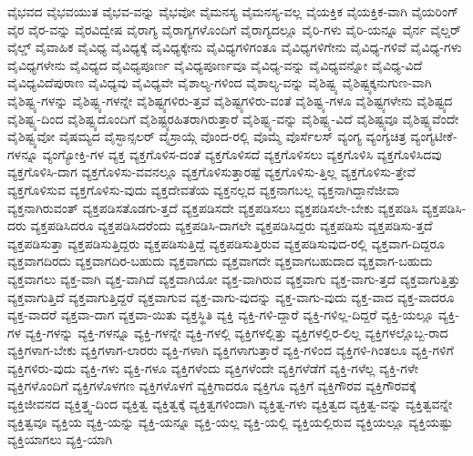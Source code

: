 {ವೈಭವದ
ವೈಭವಯುತ
ವೈಭವ-ವನ್ನು
ವೈಭವೋ
ವೈಮನಸ್ಯ
ವೈಮನಸ್ಯ-ವಲ್ಲ
ವೈಯಕ್ತಿಕ
ವೈಯಕ್ತಿಕ-ವಾಗಿ
ವೈಯರಿಂಗ್
ವೈರ
ವೈರ-ವನ್ನು
ವೈರವಿದ್ವೇಷ
ವೈರಾಗ್ಯ
ವೈರಾಗ್ಯಗಳೊಂದಿಗೆ
ವೈರಾಗ್ಯದಲ್ಲೂ
ವೈರಿ-ಗಳು
ವೈರಿ-ಯನ್ನೂ
ವೈರ್ನ
ವೈಲ್ಡರ್
ವೈಲ್ಡ್
ವೈವಾಹಿಕ
ವೈವಿಧ್ಯ
ವೈವಿಧ್ಯಕ್ಕೆ
ವೈವಿಧ್ಯಕ್ಕೇನು
ವೈವಿಧ್ಯಗಳಿಗಂತೂ
ವೈವಿಧ್ಯಗಳಿಗೇನು
ವೈವಿಧ್ಯ-ಗಳಿವೆ
ವೈವಿಧ್ಯ-ಗಳು
ವೈವಿಧ್ಯಗಳೇನು
ವೈವಿಧ್ಯದ
ವೈವಿಧ್ಯಪೂರ್ಣ
ವೈವಿಧ್ಯಪೂರ್ಣವೂ
ವೈವಿಧ್ಯ-ವನ್ನು
ವೈವಿಧ್ಯವನ್ನೋ
ವೈವಿಧ್ಯ-ವಿದೆ
ವೈವಿಧ್ಯವಿದೆಪುರಾಣ
ವೈವಿಧ್ಯವು
ವೈವಿಧ್ಯವೇ
ವೈಶಾಲ್ಯ-ಗಳಿಂದ
ವೈಶಾಲ್ಯ-ವನ್ನು
ವೈಶಿಷ್ಟ್ಯ
ವೈಶಿಷ್ಟ್ಯಕ್ಕನುಗುಣ-ವಾಗಿ
ವೈಶಿಷ್ಟ್ಯ-ಗಳನ್ನು
ವೈಶಿಷ್ಟ್ಯ-ಗಳನ್ನೇ
ವೈಶಿಷ್ಟ್ಯಗಳಿರು-ತ್ತವೆ
ವೈಶಿಷ್ಟ್ಯಗಳಿರು-ವಂತೆ
ವೈಶಿಷ್ಟ್ಯ-ಗಳೂ
ವೈಶಿಷ್ಟ್ಯಗಳೇನು
ವೈಶಿಷ್ಟ್ಯದ
ವೈಶಿಷ್ಟ್ಯ-ದಿಂದ
ವೈಶಿಷ್ಟ್ಯದೊಂದಿಗೆ
ವೈಶಿಷ್ಟ್ಯರಹಿತರಾಗಿರುತ್ತಾರೆ
ವೈಶಿಷ್ಟ್ಯ-ವನ್ನು
ವೈಶಿಷ್ಟ್ಯ-ವಿದೆ
ವೈಶಿಷ್ಟ್ಯವೂ
ವೈಶಿಷ್ಟ್ಯವೆಂದೇ
ವೈಶಿಷ್ಟ್ಯವೋ
ವೈಷಮ್ಯದ
ವೈಸ್ಛಾನ್ಸಲರ್
ವೈಸ್ರಾಯ್ಗೆ
ವೊಂದ-ರಲ್ಲಿ
ವೊಮ್ಮೆ
ವೊರ್ಸೆಲಸ್
ವ್ಯಂಗ್ಯ
ವ್ಯಂಗ್ಯಚಿತ್ರ
ವ್ಯಂಗ್ಯಟೀಕೆ-ಗಳನ್ನೂ
ವ್ಯಂಗ್ಯೋಕ್ತಿ-ಗಳ
ವ್ಯಕ್ತ
ವ್ಯಕ್ತಗೊಳಿಸ-ದಂತೆ
ವ್ಯಕ್ತಗೊಳಿಸದೆ
ವ್ಯಕ್ತಗೊಳಿಸಲು
ವ್ಯಕ್ತಗೊಳಿಸಿ
ವ್ಯಕ್ತಗೊಳಿಸಿದವು
ವ್ಯಕ್ತಗೊಳಿಸಿ-ದಾಗ
ವ್ಯಕ್ತಗೊಳಿಸು-ವವನಲ್ಲೂ
ವ್ಯಕ್ತಗೊಳಿಸುತ್ತಾರಷ್ಟೆ
ವ್ಯಕ್ತಗೊಳಿಸು-ತ್ತಿಲ್ಲ
ವ್ಯಕ್ತಗೊಳಿಸು-ತ್ತೇವೆ
ವ್ಯಕ್ತಗೊಳಿಸುವ
ವ್ಯಕ್ತಗೊಳಿಸು-ವುದು
ವ್ಯಕ್ತದೇವತೆಯ
ವ್ಯಕ್ತನಲ್ಲದ
ವ್ಯಕ್ತನಾಗಬಲ್ಲ
ವ್ಯಕ್ತನಾಗಿದ್ದಾನೆಜೀವಾ
ವ್ಯಕ್ತನಾಗಿರುವಂತ್
ವ್ಯಕ್ತಪಡಿಸತೊಡಗು-ತ್ತದೆ
ವ್ಯಕ್ತಪಡಿಸದೇ
ವ್ಯಕ್ತಪಡಿಸಲು
ವ್ಯಕ್ತಪಡಿಸಲೇ-ಬೇಕು
ವ್ಯಕ್ತಪಡಿಸಿ
ವ್ಯಕ್ತಪಡಿಸಿ-ದರು
ವ್ಯಕ್ತಪಡಿಸಿದರೂ
ವ್ಯಕ್ತಪಡಿಸಿದರೆಂದು
ವ್ಯಕ್ತಪಡಿಸಿ-ದಾಗಲೇ
ವ್ಯಕ್ತಪಡಿಸಿದ್ದರು
ವ್ಯಕ್ತಪಡಿಸು
ವ್ಯಕ್ತಪಡಿಸು-ತ್ತದೆ
ವ್ಯಕ್ತಪಡಿಸುತ್ತಾ
ವ್ಯಕ್ತಪಡಿಸುತ್ತಿದ್ದರು
ವ್ಯಕ್ತಪಡಿಸುತ್ತಿದ್ದೆ
ವ್ಯಕ್ತಪಡಿಸುತ್ತಿರುವ
ವ್ಯಕ್ತಪಡಿಸುವುದ-ರಲ್ಲಿ
ವ್ಯಕ್ತವಾಗ-ದಿದ್ದರೂ
ವ್ಯಕ್ತವಾಗದಿರದು
ವ್ಯಕ್ತವಾಗದಿರ-ಬಹುದು
ವ್ಯಕ್ತವಾಗದು
ವ್ಯಕ್ತವಾಗದೇ
ವ್ಯಕ್ತವಾಗಬಹುದಾದ
ವ್ಯಕ್ತವಾಗ-ಬಹುದು
ವ್ಯಕ್ತವಾಗಲು
ವ್ಯಕ್ತ-ವಾಗಿ
ವ್ಯಕ್ತ-ವಾಗಿದೆ
ವ್ಯಕ್ತವಾಗಿಯೋ
ವ್ಯಕ್ತ-ವಾಗಿರುವ
ವ್ಯಕ್ತವಾಗು
ವ್ಯಕ್ತ-ವಾಗು-ತ್ತದೆ
ವ್ಯಕ್ತವಾಗುತ್ತಿತ್ತು
ವ್ಯಕ್ತವಾಗುತ್ತಿದೆ
ವ್ಯಕ್ತವಾಗುತ್ತಿದ್ದರೆ
ವ್ಯಕ್ತವಾಗುವ
ವ್ಯಕ್ತ-ವಾಗು-ವುದನ್ನು
ವ್ಯಕ್ತ-ವಾಗು-ವುದು
ವ್ಯಕ್ತ-ವಾದ
ವ್ಯಕ್ತ-ವಾದರೂ
ವ್ಯಕ್ತ-ವಾದರೆ
ವ್ಯಕ್ತವಾ-ದಾಗ
ವ್ಯಕ್ತವಾ-ಯಿತು
ವ್ಯಕ್ತಸ್ಥಿತಿ
ವ್ಯಕ್ತಿ
ವ್ಯಕ್ತಿ-ಗಳಿ-ದ್ದಾರೆ
ವ್ಯಕ್ತಿ-ಗಳಿಲ್ಲ-ದಿದ್ದರೆ
ವ್ಯಕ್ತಿ-ಯಲ್ಲೂ
ವ್ಯಕ್ತಿ-ಗಳ
ವ್ಯಕ್ತಿ-ಗಳನ್ನು
ವ್ಯಕ್ತಿ-ಗಳನ್ನೂ
ವ್ಯಕ್ತಿ-ಗಳನ್ನೇ
ವ್ಯಕ್ತಿ-ಗಳಲ್ಲಿ
ವ್ಯಕ್ತಿಗಳಲ್ಲಿತ್ತು
ವ್ಯಕ್ತಿಗಳಲ್ಲಿರ-ಲಿಲ್ಲ
ವ್ಯಕ್ತಿಗಳಲ್ಲೊಬ್ಬ-ರಾದ
ವ್ಯಕ್ತಿಗಳಾಗ-ಬೇಕು
ವ್ಯಕ್ತಿಗಳಾಗ-ಲಾರರು
ವ್ಯಕ್ತಿ-ಗಳಾಗಿ
ವ್ಯಕ್ತಿಗಳಾಗುತ್ತಾರೆ
ವ್ಯಕ್ತಿ-ಗಳಿಂದ
ವ್ಯಕ್ತಿಗಳಿ-ಗಿಂತಲೂ
ವ್ಯಕ್ತಿ-ಗಳಿಗೆ
ವ್ಯಕ್ತಿಗಳಿರು-ವುದು
ವ್ಯಕ್ತಿ-ಗಳು
ವ್ಯಕ್ತಿ-ಗಳೂ
ವ್ಯಕ್ತಿಗಳೆಂದು
ವ್ಯಕ್ತಿಗಳೆಂದೇ
ವ್ಯಕ್ತಿಗಳೆಡೆಗೆ
ವ್ಯಕ್ತಿ-ಗಳೆಲ್ಲ
ವ್ಯಕ್ತಿ-ಗಳೇ
ವ್ಯಕ್ತಿಗಳೊಂದಿಗೆ
ವ್ಯಕ್ತಿಗಳೊಳಗಣ
ವ್ಯಕ್ತಿಗಳೊಳಗೆ
ವ್ಯಕ್ತಿಗಾದರೂ
ವ್ಯಕ್ತಿಗೂ
ವ್ಯಕ್ತಿಗೆ
ವ್ಯಕ್ತಿಗೌರವ
ವ್ಯಕ್ತಿಗೌರವಕ್ಕೆ
ವ್ಯಕ್ತಿಜೀವನದ
ವ್ಯಕ್ತಿತ್ತ್ವ-ದಿಂದ
ವ್ಯಕ್ತಿತ್ವ
ವ್ಯಕ್ತಿತ್ವಕ್ಕೆ
ವ್ಯಕ್ತಿತ್ವಗಳಿಂದಾಗಿ
ವ್ಯಕ್ತಿತ್ವ-ಗಳು
ವ್ಯಕ್ತಿತ್ವದ
ವ್ಯಕ್ತಿತ್ವ-ವನ್ನು
ವ್ಯಕ್ತಿತ್ವವನ್ನೇ
ವ್ಯಕ್ತಿತ್ವವೂ
ವ್ಯಕ್ತಿಯ
ವ್ಯಕ್ತಿ-ಯನ್ನು
ವ್ಯಕ್ತಿ-ಯನ್ನೂ
ವ್ಯಕ್ತಿ-ಯಲ್ಲ
ವ್ಯಕ್ತಿ-ಯಲ್ಲಿ
ವ್ಯಕ್ತಿಯಲ್ಲಿರುವ
ವ್ಯಕ್ತಿಯಲ್ಲೂ
ವ್ಯಕ್ತಿಯಷ್ಟು
ವ್ಯಕ್ತಿಯಾಗಲು
ವ್ಯಕ್ತಿ-ಯಾಗಿ
}
